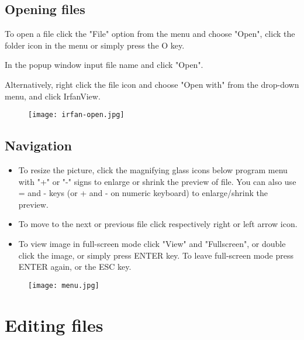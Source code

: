 \documentclass[
	fontsize=10pt, 
	twoside=true, 
	numbers=noenddot, 
]{kaobook}
\begin{document}
\subsection{Opening files}
\par To open a file click the "File" option from the menu and choose "Open", click the folder icon in the menu or simply press the O key.
\par In the popup window input file name and click "Open".
\par Alternatively, right click the file icon and choose "Open with" from the drop-down menu, and click IrfanView.
\begin{figure}[h]
    \centering
    \texttt{[image: irfan-open.jpg]}
\end{figure}

\subsection{Navigation}
\begin{itemize}
    \item To resize the picture, click the magnifying glass icons below program menu with "+" or "-" signs to enlarge or shrink the preview of file. You can also use = and - keys (or + and - on numeric keyboard) to enlarge/shrink the preview.
    \item To move to the next or previous file click respectively right or left arrow icon.
    \item To view image in full-screen mode click "View" and "Fullscreen", or double click the image, or simply press ENTER key. To leave full-screen mode press ENTER again, or the ESC key.
\end{itemize}
\begin{figure}[h]
    \centering
    \texttt{[image: menu.jpg]}
    \label{IrfanView menu}
\end{figure}

\section{Editing files}
\end{document}
